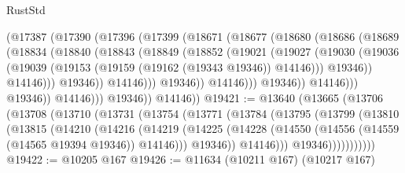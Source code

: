 \begin{lexlean}{RustStd}
\begin{coremodule}
                          (@17387
                            (@17390
                              (@17396
                                (@17399
                                  (@18671
                                    (@18677
                                      (@18680
                                        (@18686
                                          (@18689
                                            (@18834
                                              (@18840
                                                (@18843
                                                  (@18849
                                                    (@18852
                                                      (@19021
                                                        (@19027
                                                          (@19030
                                                            (@19036
                                                              (@19039
                                                                (@19153
                                                                  (@19159
                                                                    (@19162 (@19343 @19346))
                                                                    @14146)))
                                                              @19346))
                                                          @14146)))
                                                    @19346))
                                                @14146)))
                                          @19346))
                                      @14146)))
                                @19346))
                            @14146)))
                      @19346))
                  @14146)))
            @19346))
        @14146))
@19421 := @13640
    (@13665
      (@13706
        (@13708
          (@13710
            (@13731
              (@13754
                (@13771
                  (@13784
                    (@13795
                      (@13799
                        (@13810
                          (@13815
                            (@14210
                              (@14216
                                (@14219
                                  (@14225
                                    (@14228
                                      (@14550 (@14556 (@14559 (@14565 @19394 @19346)) @14146)))
                                    @19346))
                                @14146)))
                          @19346)))))))))))
@19422 := @10205 @167
@19426 := @11634 (@10211 @167) (@10217 @167)

\end{coremodule}
\end{lexlean}

